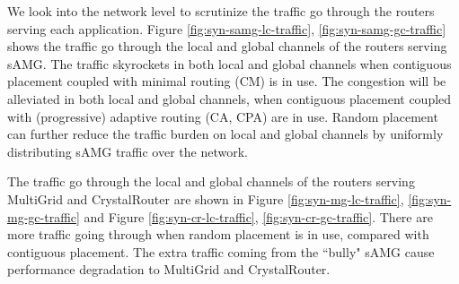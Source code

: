 \documentclass[conference,compsoc]{IEEEtran}
\begin{document}
We look into the network level to scrutinize the traffic go through the routers serving each application. Figure \ref{fig:syn-samg-lc-traffic}, \ref{fig:syn-samg-gc-traffic} shows the traffic go through the local and global channels of the routers serving sAMG. The traffic skyrockets in both local and global channels when contiguous placement coupled with minimal routing (CM) is in use.  The congestion will be alleviated in both local and global channels, when contiguous placement coupled with (progressive) adaptive routing (CA, CPA) are in use. Random placement can further reduce the traffic burden on local and global channels by uniformly distributing sAMG traffic over the network. 

The traffic go through the local and global channels of the routers serving MultiGrid and CrystalRouter are shown in Figure \ref{fig:syn-mg-lc-traffic}, \ref{fig:syn-mg-gc-traffic} and Figure \ref{fig:syn-cr-lc-traffic}, \ref{fig:syn-cr-gc-traffic}. There are more traffic going through when random placement is in use, compared with contiguous placement. The extra traffic coming from the ``bully" sAMG cause performance degradation to MultiGrid and CrystalRouter. 
\end{document}

